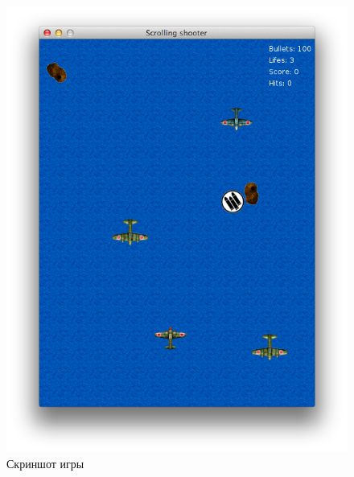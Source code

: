 \documentclass[12pt]{article}
\begin{document}
\begin{figure}[!htb]
  \centering
    \includegraphics[scale=0.5]{pics/game.png}
   \caption{Скриншот игры}
    \label{fig:game}
\end{figure}
\end{document}
